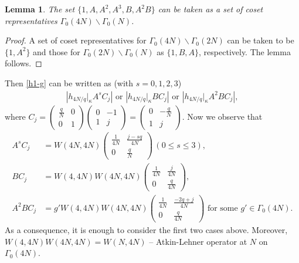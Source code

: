 \documentclass[11pt]{amsart}
\numberwithin{equation}{section}
\theoremstyle{plain}
\newtheorem{lem}[thm]{Lemma}
\theoremstyle{definition}
\newcommand{\smat}[4]{\left( \begin{smallmatrix}#1&#2\\#3&#4\end{smallmatrix}\right)}
\begin{document}
\begin{lem}
  The set $\{1, A, A^2, A^3,  B, A^2 B \}$ can be taken as a set of coset representatives $\Gamma_0(4N)\backslash \Gamma_0(N)$.
\end{lem}
\begin{proof}
A set of coset representatives for $\Gamma_0(4N)\backslash \Gamma_0(2N)$ can be taken to be $\{1,A^2 \}$ and those for $\Gamma_0(2N)\backslash \Gamma_0(N)$ as $\{1,B,A \}$, respectively. The lemma follows.
\end{proof}
Then \eqref{h1-g} can be written as (with $s=0,1,2,3$)
\begin{align}
    \left|h_{4N/q} |_\kappa A^s C_j\right| \text{ or } \left|h_{4N/q}|_\kappa BC_j\right| \text{ or } \left|h_{4N/q}|_\kappa A^2B C_j\right|,
 \end{align}
where $C_j= \smat{\frac{q}{N}}{0}{0}{1}\smat{0}{-1}{1}{j} = \smat{0}{-\frac{q}{N}}{1}{j} $. Now we observe that
\begin{align}
       A^s C_j &= W(4N,4N) \begin{pmatrix}   \frac{1}{4N} & \frac{j-sq}{4N} \\ 0 & \frac{q}{N} \end{pmatrix} \, (0 \le s \le 3),\\
       BC_j&= W(4,4N) W(4N,4N) \smat{\frac{1}{4N}}{\frac{j}{4N}}{0}{\frac{q}{4N}},\\
       A^2BC_j&= g'W(4,4N) W(4N,4N) \smat{\frac{1}{4N}}{\frac{-2q+j}{4N}}{0}{\frac{q}{4N}} \text{ for some } g'\in\Gamma_0(4N).
\end{align}
As a consequence, it is enough to consider the first two cases above. Moreover, $W(4,4N)W(4N,4N)=W(N,4N)$ -- Atkin-Lehner operator at $N$ on $\Gamma_0(4N)$. 
\end{document}
